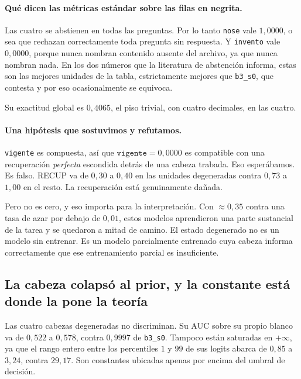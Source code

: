 \documentclass[11pt,a4paper]{article}
\begin{document}
\paragraph{Qué dicen las métricas estándar sobre las filas en negrita.} Las cuatro se abstienen en
todas las preguntas. Por lo tanto \texttt{nose} vale $1{,}0000$, o sea que rechazan correctamente toda
pregunta sin respuesta. Y \texttt{invento} vale $0{,}0000$, porque nunca nombran contenido ausente del
archivo, ya que nunca nombran nada. En los dos números que la literatura de abstención informa, estas
son las mejores unidades de la tabla, estrictamente mejores que \texttt{b3\_s0}, que contesta y por eso
ocasionalmente se equivoca.

Su exactitud global es $0{,}4065$, el piso trivial, con cuatro decimales, en las cuatro.

\paragraph{Una hipótesis que sostuvimos y refutamos.} \texttt{vigente} es compuesta, así que
$\texttt{vigente} = 0{,}0000$ es compatible con una recuperación \emph{perfecta} escondida detrás de una
cabeza trabada. Eso esperábamos. Es falso. RECUP va de $0{,}30$ a $0{,}40$ en las unidades degeneradas
contra $0{,}73$ a $1{,}00$ en el resto. La recuperación está genuinamente dañada.

Pero no es cero, y eso importa para la interpretación. Con $\approx 0{,}35$ contra una tasa de azar por
debajo de $0{,}01$, estos modelos aprendieron una parte sustancial de la tarea y se quedaron a mitad de
camino. El estado degenerado no es un modelo sin entrenar. Es un modelo parcialmente entrenado cuya
cabeza informa correctamente que ese entrenamiento parcial es insuficiente.

\subsection{La cabeza colapsó al prior, y la constante está donde la pone la teoría}
\label{sec:prior}

Las cuatro cabezas degeneradas no discriminan. Su $\mathrm{AUC}$ sobre su propio blanco va de $0{,}522$
a $0{,}578$, contra $0{,}9997$ de \texttt{b3\_s0}. Tampoco están saturadas en $+\infty$, ya que el rango
entero entre los percentiles $1$ y $99$ de sus logits abarca de $0{,}85$ a $3{,}24$, contra $29{,}17$.
Son constantes ubicadas apenas por encima del umbral de decisión.
\end{document}
